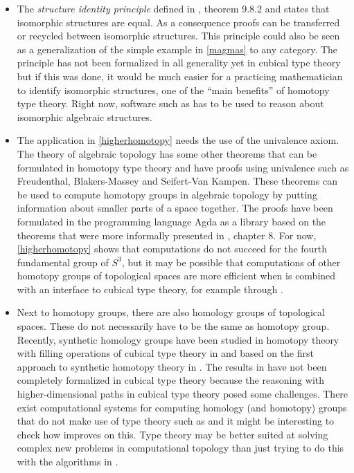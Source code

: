 \documentclass[12pt,a4paper,twoside,xetex,draft]{book}
\newcommand{\keyword}[1]{\emph{#1}\index{#1}}
\begin{document}
\begin{itemize}
\item The \keyword{structure identity principle} defined in \cite{Voevodsky2013}, theorem 9.8.2 and \cite{Aczel2012} states that isomorphic structures are equal. As a consequence proofs can be transferred or recycled between isomorphic structures. This principle could also be seen as a generalization of the simple example in \cref{magmas} to any category. The principle has not been formalized in all generality yet in cubical type theory but if this was done, it would be much easier for a practicing mathematician to identify isomorphic structures, one of the ``main benefits'' of homotopy type theory. Right now, software such as \cite{TheGAPGroup2018} has to be used to reason about isomorphic algebraic structures.

\item The application in \cref{higherhomotopy} needs the use of the univalence axiom. The theory of algebraic topology has some other theorems that can be formulated in homotopy type theory and have proofs using univalence such as Freudenthal, Blakers-Massey and Seifert-Van Kampen. These theorems can be used to compute homotopy groups in algebraic topology by putting information about smaller parts of a space together. The proofs have been formulated in the programming language Agda as a library \cite{HoBr17} based on the theorems that were more informally presented in \cite{Voevodsky2013}, chapter 8. For now, \cref{higherhomotopy} shows that computations do not succeed for the fourth fundamental group of $S^3$, but it may be possible that computations of other homotopy groups of topological spaces are more efficient when \cite{HoBru17} is combined with an interface to cubical type theory, for example through \cite{Moertberg2018}.


\item Next to homotopy groups, there are also homology groups of topological spaces. These do not necessarily have to be the same as homotopy group. Recently, synthetic homology groups have  been studied in homotopy theory with filling operations of cubical type theory in \cite{Graham2018} and based on the first approach to synthetic homotopy theory in \cite{Licata2015}. The results in \cite{Graham2018} have not been completely formalized in cubical type theory because the reasoning with higher-dimensional paths in cubical type theory posed some challenges. There exist computational systems for computing homology  (and homotopy) groups that do not make use of type theory such as \cite{GaSeSi99} and it might be interesting to check how \cite{Graham2018} improves on this. Type theory may be better suited at solving complex new problems in computational topology than just trying to do this with the algorithms in \cite{GaSeSi99}.


\end{itemize}
\end{document}
